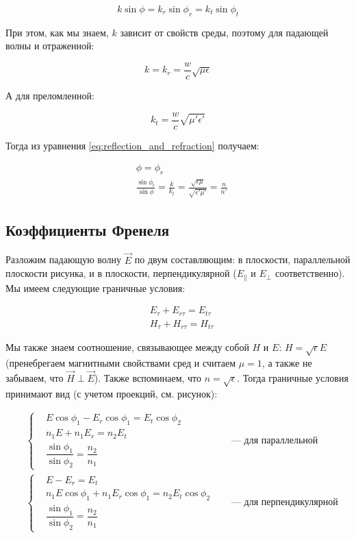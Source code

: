\begin{equation}
k\sin\phi = k_r \sin \phi_r = k_t \sin\phi_t
\label{eq:reflection_and_refraction}
\end{equation}

При этом, как мы знаем, $k$ зависит от свойств среды, поэтому для падающей волны и отраженной:

\begin{equation*}
k = k_r = \frac{w}{c} \sqrt{\mu \epsilon}
\end{equation*}

А для преломленной:

\begin{equation*}
k_t = \frac{w}{c} \sqrt{\mu'\epsilon'}
\end{equation*}

Тогда из уравнения \ref{eq:reflection_and_refraction} получаем:

\begin{align*}
&\phi = \phi_r\\
&\frac{\sin\phi_t}{\sin\phi} = \frac{k}{k_t} = \frac{\sqrt{\epsilon\mu}}{\sqrt{\epsilon'\mu'}} = \frac{n}{n'}
\end{align*}

\subsection{Коэффициенты Френеля}

Разложим падающую волну $\vec{E}$ по двум составляющим: в плоскости, параллельной плоскости рисунка, и в плоскости, перпендикулярной ($E_\parallel$ и $E_\perp$ соответственно). Мы имеем следующие граничные условия:

\begin{align*}
&E_\tau + E_{r\tau} = E_{t\tau}\\
&H_\tau + H_{r\tau} = H_{t\tau}
\end{align*}

Мы также знаем соотношение, связывающее между собой $H$ и $E$: $H = \sqrt{\epsilon}E$ (пренебрегаем магнитными свойствами сред и считаем $\mu = 1$, а также не забываем, что $\vec{H} \perp \vec{E}$). Также вспоминаем, что $n = \sqrt{\epsilon}$. Тогда граничные условия принимают вид (с учетом проекций, см. рисунок): %

\begin{align*}
&\begin{cases}
&E\cos\phi_1 - E_r\cos\phi_1 = E_t\cos\phi_2\\
&n_1 E + n_1 E_r = n_2 E_t\\
&\dfrac{\sin\phi_1}{\sin\phi_2} = \dfrac{n_2}{n_1}
\end{cases}
\quad &\text{--- для параллельной}\\
&\begin{cases}
&E - E_r = E_t\\
&n_1 E \cos\phi_1 + n_1 E_r \cos\phi_1 = n_2 E_t \cos\phi_2\\
&\dfrac{\sin\phi_1}{\sin\phi_2} = \dfrac{n_2}{n_1}
\end{cases}
\quad &\text{--- для перпендикулярной}\\
\end{align*}

